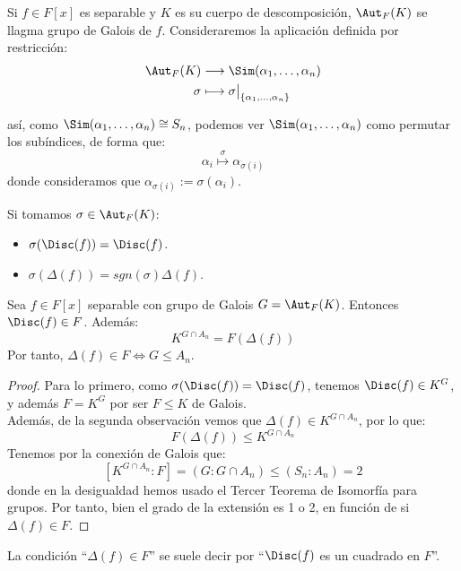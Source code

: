 \begin{definicion}
    Si $f\in F[x]$ es separable y $K$ es su cuerpo de descomposición, $\Aut_F(K)$ se llagma grupo de Galois de $f$. Consideraremos la aplicación definida por restricción:
    \begin{align*}
        \Aut_F(K) &\longrightarrow \Sim(\alpha_1, \ldots, \alpha_n) \\
        \sigma&\longmapsto \sigma\big|_{\{\alpha_1, \ldots, \alpha_n\}}
    \end{align*}

    así, como $\Sim(\alpha_1,\ldots,\alpha_n)\cong S_n$, podemos ver $\Sim(\alpha_1,\ldots,\alpha_n)$ como permutar los subíndices, de forma que:
    \begin{equation*}
        \alpha_i \stackrel{\sigma}{\longmapsto} \alpha_{\sigma(i)}
    \end{equation*}
    donde consideramos que $\alpha_{\sigma(i)} := \sigma(\alpha_i)$.
\end{definicion}


\begin{observacion}
    Si tomamos $\sigma\in \Aut_F(K)$:
    \begin{itemize}
        \item $\sigma(\Disc(f)) = \Disc(f)$.
        \item $\sigma(\Delta(f)) = sgn(\sigma)\Delta(f)$.
    \end{itemize}
\end{observacion}

\begin{prop}
    Sea $f\in F[x]$ separable con grupo de Galois $G = \Aut_F(K)$. Entonces $\Disc(f) \in F$. Además:
    \begin{equation*}
        K^{G\cap A_n} = F(\Delta(f))
    \end{equation*}
    Por tanto, $\Delta(f) \in F \Longleftrightarrow G\leq A_n$.
    \begin{proof}
        Para lo primero, como $\sigma(\Disc(f)) = \Disc(f)$, tenemos $\Disc(f)\in K^G$, y además $F = K^G$ por ser $F\leq K$ de Galois.\\

        \noindent
        Además, de la segunda observación vemos que $\Delta(f)\in K^{G\cap A_n}$, por lo que:
        \begin{equation*}
            F(\Delta(f)) \leq K^{G\cap A_n}
        \end{equation*}
        Tenemos por la conexión de Galois que:
        \begin{equation*}
            \left[K^{G\cap A_n} : F\right] = (G : G\cap A_n) \leq (S_n : A_n) = 2
        \end{equation*}
        donde en la desigualdad hemos usado el Tercer Teorema de Isomorfía para grupos. Por tanto, bien el grado de la extensión es 1 o 2, en función de si $\Delta(f) \in F$. %
    \end{proof}
\end{prop}

\noindent
La condición ``$\Delta(f)\in F$'' se suele decir por ``$\Disc(f)$ es un cuadrado en $F$''.
